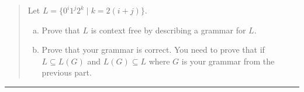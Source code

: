 \documentclass[11pt]{article}
\begin{document}



\begin{quote}

Let $L = \{0^i1^j2^k \mid k = 2(i+j)\}$.
\begin{enumerate}[(a)]
	\item Prove that $L$ is context free by describing a grammar for $L$.
	\item Prove that your grammar is correct. You need to prove
	that if $L \subseteq L(G)$ and $L(G) \subseteq L$ where $G$ is your
	grammar from the previous part.
\end{enumerate}

\end{quote}
\hrule
\end{document}
